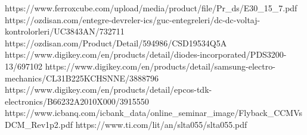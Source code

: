 \documentclass[12pt]{article}
\begin{document}




\begin{thebibliography}{00}
    https://www.ferroxcube.com/upload/media/product/file/Pr\_ds/E30\_15\_7.pdf
     https://ozdisan.com/entegre-devreler-ics/guc-entegreleri/dc-dc-voltaj-kontrolorleri/UC3843AN/732711
     https://ozdisan.com/Product/Detail/594986/CSD19534Q5A
     https://www.digikey.com/en/products/detail/diodes-incorporated/PDS3200-13/697102 
     https://www.digikey.com/en/products/detail/samsung-electro-mechanics/CL31B225KCHSNNE/3888796
     https://www.digikey.com/en/products/detail/epcos-tdk-electronics/B66232A2010X000/3915550
     https://www.icbanq.com/icbank\_data/online\_seminar\_image/Flyback\_CCMVsDCM\_Rev1p2.pdf
    https://www.ti.com/lit/an/slta055/slta055.pdf
\end{thebibliography}
\end{document}
